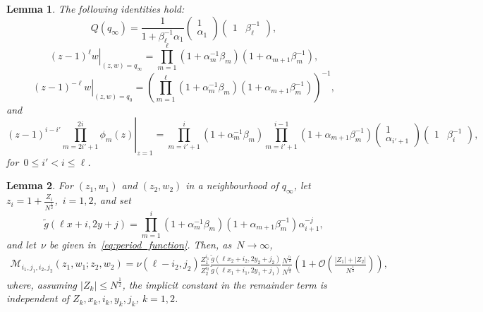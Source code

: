 \documentclass[10pt,a4paper]{amsart}
\newtheorem{lemma}{Lemma}
\newcommand{\Ordo}{\mathcal{O}}
\begin{document}
\begin{lemma}\label{lem:at_1}
The following identities hold:
\begin{equation}\label{eq:at_1_1}
Q(q_\infty)=\frac{1}{1+\beta_\ell^{-1} \alpha_1}
\begin{pmatrix}
1 \\
\alpha_1
\end{pmatrix}
\begin{pmatrix}
1 & \beta_\ell^{-1}
\end{pmatrix},
\end{equation}
\begin{equation}\label{eq:at_1_2}
\left.(z-1)^\ell w\right|_{(z,w)=q_{\infty}}=\prod_{m=1}^\ell(1+\alpha_m^{-1}\beta_m)(1+\alpha_{m+1}\beta_m^{-1}),
\end{equation}
\begin{equation}\label{eq:at_1_2_q0}
\left.(z-1)^{-\ell} w\right|_{(z,w)=q_{0}}=\left(\prod_{m=1}^\ell(1+\alpha_m^{-1}\beta_m)(1+\alpha_{m+1}\beta_m^{-1})\right)^{-1},
\end{equation}
and
\begin{equation}\label{eq:at_1_3}
\left.(z-1)^{i-i'}\prod_{m=2i'+1}^{2i}\phi_m(z)\right|_{z=1}
=\prod_{m=i'+1}^i(1+\alpha_m^{-1}\beta_m)\prod_{m=i'+1}^{i-1}(1+\alpha_{m+1}\beta_m^{-1})
\begin{pmatrix}
1 \\
\alpha_{i'+1}
\end{pmatrix}
\begin{pmatrix}
1 & \beta_i^{-1}
\end{pmatrix},
\end{equation}
for~$0\leq i'<i\leq \ell$.
\end{lemma}

\begin{lemma}\label{lem:matrix_local}
For $(z_1,w_1)$ and $(z_2,w_2)$ in a neighbourhood of $q_{\infty}$, let
~$z_i=1+\frac{Z_i}{N^\frac{1}{2}}$,~$i=1,2$, and set
\begin{equation}
\tilde g(\ell x+i,2y+j)=\prod_{m=1}^i(1+\alpha_m^{-1}\beta_m)(1+\alpha_{m+1}\beta_m^{-1})\alpha_{i+1}^{-j},
\end{equation}
and let~$\nu$ be given in~\eqref{eq:period_function}. Then, as~$N\to \infty$, 
\begin{multline} \label{eqn:matrix_precise}
\boldsymbol{\mathcal{M}}_{i_1,j_1,i_2,j_2}\left(z_1,w_1;z_2,w_2\right)
%
= \nu(\ell-i_2,j_2)\frac{Z_1^{i_1}}{Z_2^{i_2}}\frac{\tilde g(\ell x_2+i_2,2y_2+j_2)}{\tilde g(\ell x_1+i_1,2y_1+j_1)}\frac{N^{\frac{i_2}{2}}}{N^{\frac{i_1}{2}}}\left(1+\Ordo\left(\frac{|Z_1|+|Z_2|}{N^{\frac{1}{2}}}\right)\right),
\end{multline}
where, assuming $|Z_k|\leq N^{\frac{1}{2}}$, the implicit constant in the remainder term is independent of $Z_k, x_k, i_k, y_k, j_k$, $k=1,2$.
\end{lemma}
\end{document}
